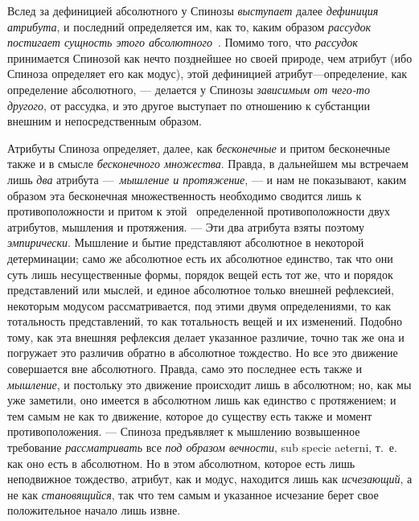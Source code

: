 Вслед за дефиницией абсолютного у Спинозы
{\em выступает} далее
{\em дефиниция атрибута}, и последний определяется им,
как то, каким образом {\em рассудок постигает сущность
этого
абсолютного}~\label{bkm:Ref474669634}.
Помимо того, что {\em рассудок} принимается Спинозой
как нечто позднейшее но своей природе, чем атрибут (ибо Спиноза определяет
его как модус), этой дефиницией атрибут—определение, как определение
абсолютного, — делается у Спинозы {\em зависимым от
чего-то другого}, от рассудка, и это другое выступает по отношению к
субстанции внешним и непосредственным образом.

Атрибуты Спиноза определяет, далее, как
{\em бесконечные} и притом бесконечные также и в смысле
{\em бесконечного множества}. Правда, в дальнейшем мы
встречаем лишь {\em два} атрибута
—~{\em мышление и протяжение}, — и нам не показывают,
каким образом эта бесконечная множественность необходимо сводится лишь к
противоположности и притом к этой \ определенной противоположности двух
атрибутов, мышления и протяжения. — Эти два атрибута взяты поэтому
{\em эмпирически}. Мышление и бытие представляют
абсолютное в некоторой детерминации; само же абсолютное есть их абсолютное
единство, так что они суть лишь несущественные формы, порядок вещей есть
тот же, что и порядок представлений или мыслей, и единое абсолютное только
внешней рефлексией, некоторым модусом рассматривается, под этими двумя
определениями, то как тотальность представлений, то как тотальность вещей и
их изменений. Подобно тому, как эта внешняя рефлексия делает указанное
различие, точно так же она и погружает это различив обратно в абсолютное
тождество. Но все это движение совершается вне абсолютного. Правда, само
это последнее есть также и {\em мышление}, и постольку
это движение происходит лишь в абсолютном; но, как мы уже заметили, оно
имеется в абсолютном лишь как единство с протяжением; и тем самым не как то
движение, которое до существу есть также и момент противоположения. —
Спиноза предъявляет к мышлению возвышенное требование
{\em рассматривать} все {\em под
образом вечности}, sub specie aeterni, т.~е. как оно есть в абсолютном. Но
в этом абсолютном, которое есть лишь неподвижное тождество, атрибут, как и
модус, находится лишь как {\em исчезающий}, а не как
{\em становящийся}, так что тем самым и указанное
исчезание берет свое положительное начало лишь извне.


